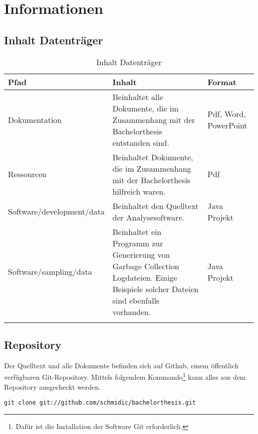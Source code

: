 \chapter{Informationen}

\section*{Inhalt Datenträger}
  \begin{longtable}{|p{5.5cm}|p{5cm}|p{2.5cm}|}
\hline
  \textbf{Pfad} & \textbf{Inhalt} & \textbf{Format}\\\hline
    Dokumentation &Beinhaltet alle Dokumente, die im Zusammenhang mit der Bachelorthesis entstanden sind.
&Pdf, Word, PowerPoint\\\hline
    Ressourcen & Beinhaltet Dokumente, die im Zusammenhang mit der Bachelorthesis hilfreich waren. & Pdf\\\hline
    Software/development/data & Beinhaltet den Quelltext der Analysesoftware. & Java Projekt\\\hline
    Software/sampling/data & Beinhaltet ein Programm zur Generierung von Garbage Collection Logdateien. Einige Beispiele solcher Dateien sind ebenfalls vorhanden. & Java Projekt\\\hline
      \caption{Inhalt Datenträger}\\
  \end{longtable}

\section*{Repository}
Der Quelltext und alle Dokumente befinden sich auf Github, einem öffentlich verfügbaren Git-Repository. Mittels folgendem Kommando\footnote{Dafür ist die Installation der Software Git erforderlich.} kann alles aus dem Repository ausgecheckt werden.

\begin{lstlisting}[caption=Checkout Quelltext Repository]
git clone git://github.com/schmidic/bachelorthesis.git
\end{lstlisting}



